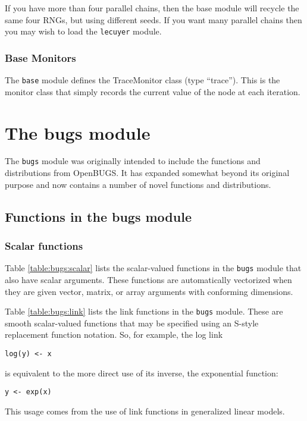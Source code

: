 \documentclass[11pt, a4paper, titlepage]{report}
\newcommand{\OpenBUGS}{\textsf{OpenBUGS}}
\begin{document}
If you have more than four parallel chains, then the base module will
recycle the same four RNGs, but using different seeds. If you want
many parallel chains then you may wish to load the \verb+lecuyer+
module.

\subsection{Base Monitors}

The \verb+base+ module defines the TraceMonitor class (type
``trace''). This is the monitor class that simply records the current
value of the node at each iteration.

\chapter{The bugs module}
\label{chapter:bugs}

The \texttt{bugs} module was originally intended to include the
functions and distributions from \OpenBUGS. It has expanded somewhat
beyond its original purpose and now contains a number of novel
functions and distributions.

\section{Functions in the bugs module}
\label{section:bugs:functions}

\subsection{Scalar functions}

Table \ref{table:bugs:scalar} lists the scalar-valued functions in the
\texttt{bugs} module that also have scalar arguments.  These functions
are automatically vectorized when they are given vector, matrix, or
array arguments with conforming dimensions.

Table \ref{table:bugs:link} lists the link functions in the
\texttt{bugs} module.  These are smooth scalar-valued functions that
may be specified using an S-style replacement function notation. So,
for example, the log link
\begin{verbatim}
log(y) <- x
\end{verbatim}
is equivalent to the more direct use of its inverse, the exponential
function:
\begin{verbatim}
y <- exp(x)
\end{verbatim}
This usage comes from the use of link functions in generalized linear
models.
\end{document}
